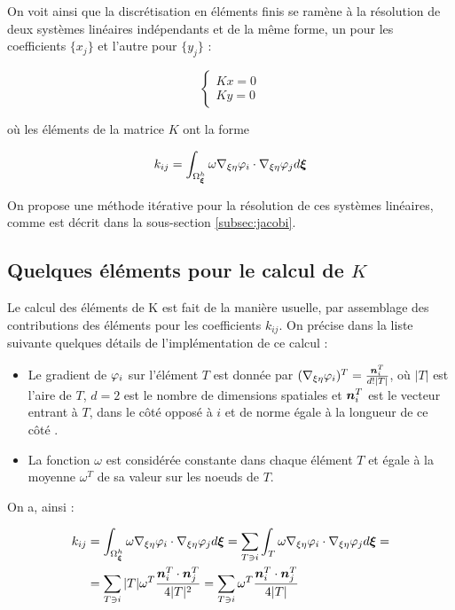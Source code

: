 \indent On voit ainsi que la discrétisation en éléments finis se ramène à la résolution de deux systèmes linéaires indépendants et de la même forme, un pour les coefficients \(\{x_j\}\) et l'autre pour \(\{y_j\}\) : 

\begin{equation}
	\label{eq:syst_final}
	\begin{cases}
		Kx = 0 \\
		Ky = 0
	\end{cases}
\end{equation}

\noindent où les éléments de la matrice \(K\) ont la forme

\begin{equation}
  k_{ij} = \int_{\Omega_{\boldsymbol{\xi}}^h}{ \omega \nabla_{\xi\eta} \varphi_i \cdot \nabla_{\xi\eta} \varphi_j  d\boldsymbol{\xi}}
\end{equation}

\indent On propose une méthode itérative pour la résolution de ces systèmes linéaires, comme est décrit dans la sous-section \ref{subsec:jacobi}. 

\subsection{Quelques éléments pour le calcul de \(K\)}
\label{subsec:calculK}

\indent Le calcul des éléments de K est fait de la manière usuelle, par assemblage des contributions des éléments pour les coefficients \(k_{ij}\). On précise dans la liste suivante quelques détails de l'implémentation de ce calcul : 

\begin{itemize}
	\item Le gradient de \(\varphi_i\) sur l'élément \(T\) est donnée par \((\nabla_{\xi\eta} \varphi_i)^T = \frac{\boldsymbol{n}_i^T}{d\text{!}|T|}\), où \(|T|\) est l'aire de \(T\), \(d=2\) est le nombre de dimensions spatiales et \(\boldsymbol{n}_i^T\) est le vecteur entrant à \(T\), dans le côté opposé à \(i\) et de norme égale à la longueur de ce côté \cite{vecNormal}.
	\item La fonction \(\omega\) est considérée constante dans chaque élément \(T\) et égale à la moyenne \(\omega^T\) de sa valeur sur les noeuds de \(T\).
\end{itemize}

\indent On a, ainsi : 

\begin{equation}
\label{eq:calculK_2d}
\begin{gathered}
\begin{aligned}
	k_{ij} & = \int_{\Omega_{\boldsymbol{\xi}}^h}{ \omega \nabla_{\xi\eta} \varphi_i  \cdot \nabla_{\xi\eta} \varphi_j  d\boldsymbol{\xi}} = \sum_{T \ni i} {\int_{T}{ \omega \nabla_{\xi\eta} \varphi_i \cdot \nabla_{\xi\eta} \varphi_j  d\boldsymbol{\xi}}} = \\
	       &  = \sum_{T \ni i}
	              { 
	                     { |T|\omega^T \frac{\boldsymbol{n}_i^T\cdot \boldsymbol{n}_j^T}{4|T|^2}
	                     }
	              }
	          = \sum_{T \ni i}
	              { 
	                     { \omega^T \frac{\boldsymbol{n}_i^T\cdot \boldsymbol{n}_j^T}{4|T|}
	                     }
	              }	              
\end{aligned}
\end{gathered}
\end{equation}

